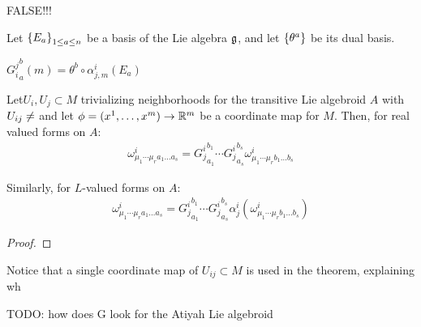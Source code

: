 {\color{gray} FALSE!!!

Let $\left\{ E_a \right\}_{1 \leq a \leq n}$ be a basis of the Lie algebra $\mathfrak{g}$, and let $\left\{ \theta^a \right\}$ be its dual basis.

\begin{definition}
    ${G_i^j}_a^b(m) = \theta^b \circ \alpha^i_{j, m}(E_a)$
\end{definition}

\begin{theorem}
Let$U_i, U_j \subset M$ trivializing neighborhoods for the transitive Lie algebroid $A$ with $U_{ij} \neq \empty$ and let $\phi = (x^1, \dots, x^m) \to \RR^m$ be a coordinate map for $M$. Then, for real valued forms on $A$:
\begin{align}
    \omega^i_{\mu_1 \cdots \mu_r a_1 \dots a_s} = {G^i_j}^{b_1}_{a_1} \cdots {G^i_j}^{b_s}_{a_s} \omega^i_{\mu_1 \cdots \mu_r b_1 \dots b_s}
\end{align}

Similarly, for $L$-valued forms on $A$:
\begin{align}
    \omega^i_{\mu_1 \cdots \mu_r a_1 \dots a_s} = {G^i_j}^{b_1}_{a_1} \cdots {G^i_j}^{b_s}_{a_s} \alpha^i_j(\omega^i_{\mu_1 \cdots \mu_r b_1 \dots b_s})
\end{align}
\end{theorem}
\begin{proof}

\end{proof}
\begin{remark}
Notice that a single coordinate map of $U_{ij} \subset M$ is used in the theorem, explaining wh
\end{remark}

TODO: how does G look for the Atiyah Lie algebroid}


